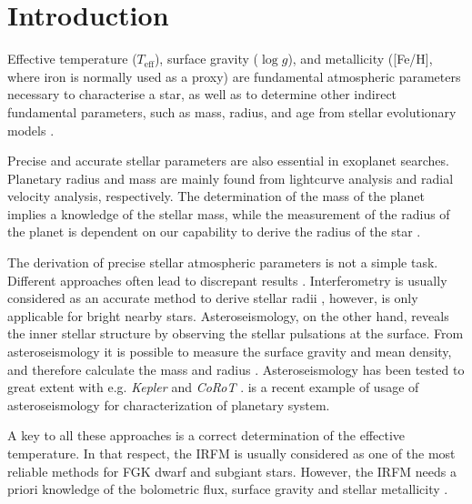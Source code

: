 \documentclass{aa}
\begin{document}
\maketitle



\section{Introduction}
\label{sec:introduction}

Effective temperature ($T_\mathrm{eff}$), surface gravity ($\log g$),
and metallicity ([Fe/H], where iron is normally used as a proxy)
are fundamental atmospheric parameters necessary to characterise a
star, as well as to determine other indirect fundamental parameters,
such as mass, radius, and age from stellar evolutionary models
\citep[e.g.][]{Girardi2000,Dotter2008,Baraffe2015}.

Precise and accurate stellar parameters are also essential in
exoplanet searches. Planetary radius and mass are mainly found from
lightcurve analysis and radial velocity analysis, respectively. The
determination of the mass of the planet implies a knowledge of the
stellar mass, while the measurement of the radius of the planet
is dependent on our capability to derive the radius of the star
\citep{Ammler2009,Torres2008,Torres2012}.

The derivation of precise stellar atmospheric parameters is not a simple
task. Different approaches often lead to discrepant results \citep[see
e.g.][]{Santos13}. Interferometry is usually considered as an accurate
method to derive stellar radii \citep[e.g.][]{Boyajian2012}, however,
is only applicable for bright nearby stars. Asteroseismology, on the
other hand, reveals the inner stellar structure by observing the stellar
pulsations at the surface. From asteroseismology it is possible to
measure the surface gravity and mean density, and therefore calculate
the mass and radius \citep[e.g.][]{Kjeldsen1995}. Asteroseismology has
been tested to great extent with e.g. \emph{Kepler} and \emph{CoRoT}
\citep{Michel2008,Huber2011,Huber2012}. \cite{Campante2015} is a recent
example of usage of asteroseismology for characterization of planetary
system.

A key to all these approaches is a correct determination of the
effective temperature. In that respect, the IRFM is usually
considered as one of the most reliable methods for FGK dwarf
and subgiant stars. However, the IRFM needs a priori knowledge
of the bolometric flux, surface gravity and stellar metallicity
\citep{Blackwell1977,Ramirez2005b,Casagrande2010}.
\end{document}
